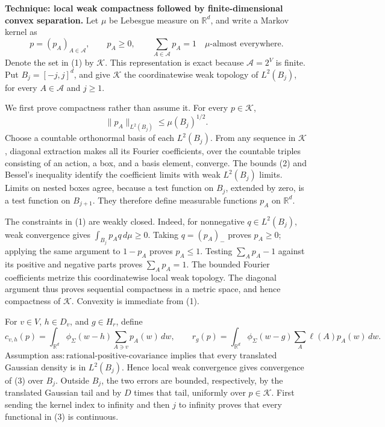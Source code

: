 \textbf{Technique: local weak compactness followed by finite-dimensional convex
separation.}
Let \(\mu\) be Lebesgue measure on \(\mathbb R^d\), and write a Markov
kernel as
\[
 p=(p_A)_{A\in\mathcal A},\qquad
 p_A\geq0,\qquad \sum_{A\in\mathcal A}p_A=1
 \quad\mu\text{-almost everywhere}.
\tag{1}
\]
Denote the set in (1) by \(\mathscr K\).  This representation is exact because
\(\mathcal A=2^V\) is finite.  Put \(B_j=[-j,j]^d\), and give
\(\mathscr K\) the coordinatewise weak topology of \(L^2(B_j)\), for every
\(A\in\mathcal A\) and \(j\geq1\).

We first prove compactness rather than assume it.  For every \(p\in\mathscr K\),
\[
 \|p_A\|_{L^2(B_j)}\leq\mu(B_j)^{1/2}.
\tag{2}
\]
Choose a countable orthonormal basis of each \(L^2(B_j)\).  From any sequence
in \(\mathscr K\), diagonal extraction makes all its Fourier coefficients,
over the countable triples consisting of an action, a box, and a basis
element, converge.  The bounds (2) and Bessel's inequality identify the
coefficient limits with weak \(L^2(B_j)\) limits.  Limits on nested boxes
agree, because a test function on \(B_j\), extended by zero, is a test
function on \(B_{j+1}\).  They therefore define measurable functions
\(p_A\) on \(\mathbb R^d\).

The constraints in (1) are weakly closed.  Indeed, for nonnegative
\(q\in L^2(B_j)\), weak convergence gives
\(\int_{B_j}p_Aq\,d\mu\geq0\).  Taking \(q=(p_A)_-\) proves
\(p_A\geq0\); applying the same argument to \(1-p_A\) proves \(p_A\leq1\).
Testing \(\sum_Ap_A-1\) against its positive and negative parts proves
\(\sum_Ap_A=1\).  The bounded Fourier coefficients metrize this
coordinatewise local weak topology.  The diagonal argument thus proves
sequential compactness in a metric space, and hence compactness of
\(\mathscr K\).  Convexity is immediate from (1).

For \(v\in V\), \(h\in D_v\), and \(g\in H_r\), define
\[
 c_{v,h}(p)=
 \int_{\mathbb R^d}\phi_\Sigma(w-h)
       \sum_{A\ni v}p_A(w)\,dw,
 \qquad
 r_g(p)=
 \int_{\mathbb R^d}\phi_\Sigma(w-g)
       \sum_A\ell(A)p_A(w)\,dw.
\tag{3}
\]
Assumption \(\mathrm{ass:rational\mbox{-}positive\mbox{-}covariance}\)
implies that every translated Gaussian density is in \(L^2(B_j)\).  Hence
local weak convergence gives convergence of (3) over \(B_j\).  Outside
\(B_j\), the two errors are bounded, respectively, by the translated
Gaussian tail and by \(D\) times that tail, uniformly over \(p\in\mathscr K\).
First sending the kernel index to infinity and then \(j\) to infinity proves
that every functional in (3) is continuous.

